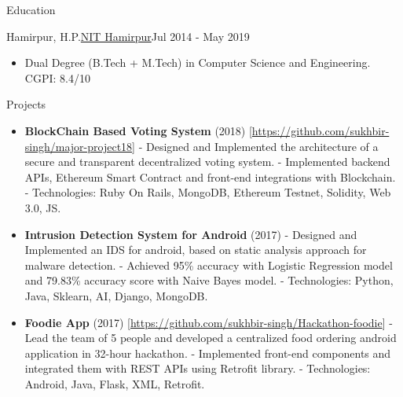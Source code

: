\documentclass[]{mcdowellcv}
\begin{document}
	\begin{cvsection}{Education}
		\begin{cvsubsection}{Hamirpur, H.P.}{\href {http://nith.ac.in/}{NIT Hamirpur}}{Jul 2014 - May 2019}
			\begin{itemize}
				\item Dual Degree (B.Tech + M.Tech) in Computer Science and Engineering. CGPI: 8.4/10
			\end{itemize}
		\end{cvsubsection}
	\end{cvsection}
	
	\begin{cvsection}{Projects}
		\begin{cvsubsection}{}{}{}
			\begin{itemize}
				\item \textbf{BlockChain Based Voting System} (2018) \textcolor[rgb]{.2,.2,.2}{[\href {https://github.com/sukhbir-singh/major-project18}{https://github.com/sukhbir-singh/major-project18}]}
				\newline- Designed and Implemented the architecture of a secure and transparent decentralized voting system.
				\newline- Implemented backend APIs, Ethereum Smart Contract and front-end integrations with Blockchain.
				\newline- Technologies: Ruby On Rails, MongoDB, Ethereum Testnet, Solidity, Web 3.0, JS.
				\newline
				\item \textbf{Intrusion Detection System for Android} (2017) 
				\newline- Designed and Implemented an IDS for android, based on static analysis approach for malware detection.
				\newline- Achieved 95\% accuracy with Logistic Regression model and 79.83\% accuracy score with Naive Bayes model.
				\newline- Technologies: Python, Java, Sklearn, AI, Django, MongoDB.
				\newline
				\item \textbf{Foodie App} (2017) \textcolor[rgb]{.2,.2,.2}{[\href {https://github.com/sukhbir-singh/Hackathon-foodie}{https://github.com/sukhbir-singh/Hackathon-foodie}]}
				\newline- Lead the team of 5 people and developed a centralized food ordering android application in 32-hour hackathon.
				\newline- Implemented front-end components and integrated them with REST APIs using Retrofit library.
				\newline- Technologies: Android, Java, Flask, XML, Retrofit.

			\end{itemize}
		\end{cvsubsection}
	\end{cvsection}
\end{document}
